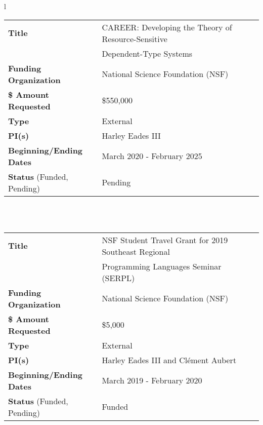 \documentclass[11pt]{article}
\begin{document}
    \begin{center}
      \begin{tabular}{l}
        \begin{tabular}{|l|l|l|}
          \hline
          \textbf{Title} & CAREER: Developing the Theory of Resource-Sensitive\,\,\,\,\,\,\,\,\,\,\,\,\,\,\,\,\,\,\,\,\,\,\,\,\,\,\,\,\,\,\,\\
                         & Dependent-Type Systems \\
          \hline
          \textbf{Funding Organization} & National Science Foundation (NSF)\\
          \hline
          \textbf{\$ Amount Requested} & \$550,000\\
          \hline
          \textbf{Type} & External\\
          \hline
          \textbf{PI(s)} & Harley Eades III\\
          \hline
          \textbf{Beginning/Ending Dates} & March 2020 - February 2025\\
          \hline
          \textbf{Status} (Funded, Pending) & Pending\\
          \hline
        \end{tabular}\\
        \\
        \begin{tabular}{|l|l|l|}
          \hline
          \textbf{Title} & NSF Student Travel Grant for 2019 Southeast Regional\,\,\,\,\,\,\,\,\,\,\,\,\,\,\,\,\,\,\,\,\,\,\,\,\,\,\,\,\,\,\,\, \\
                         & Programming Languages Seminar (SERPL)\\
          \hline
          \textbf{Funding Organization} & National Science Foundation (NSF)\\
          \hline
          \textbf{\$ Amount Requested} & \$5,000\\
          \hline
          \textbf{Type} & External\\
          \hline
          \textbf{PI(s)} & Harley Eades III and Cl\'ement Aubert\\
          \hline
          \textbf{Beginning/Ending Dates} & March 2019 - February 2020\\
          \hline
          \textbf{Status} (Funded, Pending) & Funded\\
          \hline
        \end{tabular}\\
        \\

\end{tabular}
\end{center}
\end{document}
